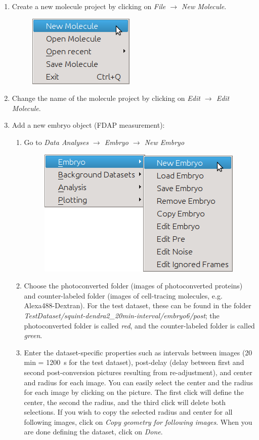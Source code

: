 \documentclass[a4paper,11pt]{article}
\begin{document}
\newcommand{\imgscale}{0.3}

\begin{enumerate}
 \item Create a new molecule project by clicking on \textit{File $\rightarrow$ New Molecule}.
 \begin{figure}[H]
  \centering
  \includegraphics[scale=\imgscale]{figs/new_molecule.png}
 \end{figure}

 \item Change the name of the molecule project by clicking on \textit{Edit $\rightarrow$ Edit Molecule}.
 \item Add a new embryo object (FDAP measurement):
 \begin{enumerate}
 \item Go to \textit{Data Analyses $\rightarrow$ Embryo $\rightarrow$ New Embryo}
 \begin{figure}[H]
  \centering
  \includegraphics[scale=\imgscale]{figs/new_embryo.png}
 \end{figure}
 \item Choose the photoconverted folder (images of photoconverted proteins) and counter-labeled folder (images of cell-tracing molecules, e.g. Alexa488-Dextran). For the test dataset, these can be found in the folder \textit{TestDataset/squint-dendra2\_20min-interval/embryo6/post}; the photoconverted folder is called \textit{red}, and the counter-labeled folder is called \textit{green}.
 \item Enter the dataset-specific properties such as intervals between images (20 min = 1200~s for the test dataset), post-delay (delay between first and second post-conversion pictures resulting from re-adjustment), and center and radius for each image. You can easily select the center and the radius for each image by clicking on the picture. The first click will define the center, the second the radius, and the third click will delete both selections. If you wish to copy the selected radius and center for all following images, click on \textit{Copy geometry for following images}. When you are done defining the dataset, click on \textit{Done}.

\end{enumerate}
\end{enumerate}
\end{document}
